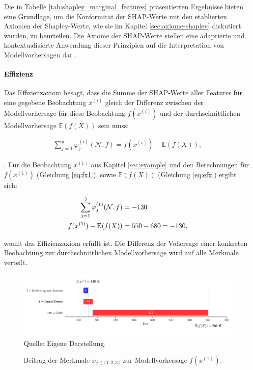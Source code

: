 Die in Tabelle \ref{tab:shapley_marginal_features} präsentierten Ergebnisse bieten eine Grundlage, 
um die Konformität der SHAP-Werte mit den etablierten Axiomen der Shapley-Werte, wie sie im 
Kapitel \ref{sec:axiome-shapley} diskutiert wurden, zu beurteilen. Die Axiome der SHAP-Werte stellen 
eine adaptierte und kontextualisierte Anwendung dieser Prinzipien auf die Interpretation von 
Modellvorhersagen dar \cite{NIPS2017_8a20a862}.


\paragraph{Effizienz}

Das Effizienzaxiom besagt, dass die Summe der SHAP-Werte aller Features für eine gegebene Beobachtung $x^{(i)}$ 
gleich der Differenz zwischen der Modellvorhersage für diese Beobachtung $f(x^{(i)})$ 
und der durchschnittlichen Modellvorhersage $\mathbb{E}(f(X))$ sein muss:

\begin{align}
    \sum_{j=1}^{p}\varphi_j^{(i)}(\mathcal{N}, f) = f(x^{(i)}) - \mathbb{E}(f(X)),
\end{align}

\cite[S. 221]{Molnar_2022}. Für die Beobachtung $x^{(1)}$ aus Kapitel \ref{sec:example} und den Berechnungen 
für $f(x^{(1)})$ (Gleichung \ref{eq:fx1}), sowie $\mathbb{E}(f(X))$ (Gleichung \ref{eq:efx}) ergibt sich:

\begin{align}
    \sum_{j=1}^{3}\varphi_j^{(1)}(\mathcal{N}, f) &=  -130 \\ \notag
    f(x^{(1)}) - \mathbb{E}(f(X)) &= 550 - 680 = -130,   
\end{align}

womit das Effizienzaxiom erfüllt ist. Die Differenz der Vohersage 
einer konkreten Beobachtung zur durchschnittlichen 
Modellvorhersage wird auf alle Merkmale verteilt.

\begin{figure}[H]
    \caption{Beitrag der Merkmale $x_{j \in \{1, 2, 3\}}$ zur Modellvorhersage $f(x^{(1)})$.}
    \includegraphics[width=1\textwidth]{../notebooks/model-output-x1.png}
    Quelle: Eigene Darstellung.
    \label{pic:model-fx1}
\end{figure}

